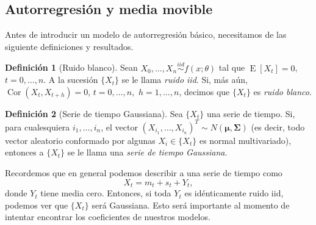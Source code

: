 \documentclass[11pt,letterpaper]{article}
\newcommand{\expected}{\ensuremath{\operatorname{E}}}
\newcommand{\correlation}{\ensuremath{\operatorname{Cor}}}
\theoremstyle{definition}
\newtheorem{definition}{Definición}[section]
\theoremstyle{theorem}
\theoremstyle{remark}
\begin{document}
	\subsection{Autorregresión y media movible}
	\noindent\justify Antes de introducir un modelo de autorregresión básico, necesitamos de las siguiente definiciones y resultados.
	\begin{definition}[Ruido blanco]
		Sean \(X_0,\dots,X_n\overset{iid}{\sim}f(x;\theta)\) tal que \(\expected[X_t]=0\), \(t=0,\dots,n\). A la sucesión \(\{X_t\}\) se le llama \textit{ruido iid}. Si, más aún, \(\correlation(X_t,X_{t+h})=0\), \(t=0,\dots,n, \) \(h=1,\dots,n\), decimos que \(\{X_t\}\) es \textit{ruido blanco}.
	\end{definition}
	\begin{definition}[Serie de tiempo Gaussiana]
		Sea \(\{X_t\}\) una serie de tiempo. Si, para cualesquiera \(i_1,\dots,i_n\), el vector \((X_{i_1},\dots,X_{i_n})^T\sim N(\boldsymbol{\mu},\boldsymbol{\Sigma})\) (es decir, todo vector aleatorio conformado por algunas \(X_i\in\{X_t\}\) es normal multivariado), entonces a \(\{X_t\}\) se le llama una \textit{serie de tiempo Gaussiana}.
	\end{definition}
	Recordemos que en general podemos describir a una serie de tiempo como \[X_t=m_t+s_t+Y_t,\] donde \(Y_t\) tiene media cero. Entonces, si toda \(Y_t\) es idénticamente ruido iid, podemos ver que \(\{X_t\}\) será Gaussiana. Esto será importante al momento de intentar encontrar los coeficientes de nuestros modelos.
\end{document}
